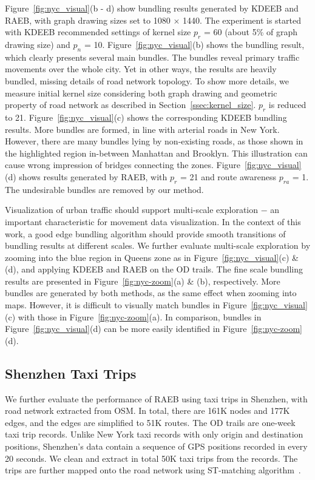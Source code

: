 Figure~\ref{fig:nyc_visual}(b - d) show bundling results generated by KDEEB and RAEB, with graph drawing sizes set to 1080 $\times$ 1440.
The experiment is started with KDEEB recommended settings of kernel size $p_r$ = 60 (about 5\% of graph drawing size) and $p_n$ = 10.
Figure~\ref{fig:nyc_visual}(b) shows the bundling result, which clearly presents several main bundles.
The bundles reveal primary traffic movements over the whole city.
Yet in other ways, the results are heavily bundled, missing details of road network topology.
To show more details, we measure initial kernel size considering both graph drawing and geometric property of road network as described in Section~\ref{ssec:kernel_size}.
$p_r$ is reduced to 21.
Figure~\ref{fig:nyc_visual}(c) shows the corresponding KDEEB bundling results.
More bundles are formed, in line with arterial roads in New York.
However, there are many bundles lying by non-existing roads, as those shown in the highlighted region in-between Manhattan and Brooklyn.
This illustration can cause wrong impression of bridges connecting the zones.
Figure~\ref{fig:nyc_visual}(d) shows results generated by RAEB, with $p_r$ = 21 and route awareness $p_{ra}$ = 1.
The undesirable bundles are removed by our method.

Visualization of urban traffic should support multi-scale exploration $-$ an important characteristic for movement data visualization.
In the context of this work, a good edge bundling algorithm should provide smooth transitions of bundling results at different scales.
We further evaluate multi-scale exploration by zooming into the blue region in Queens zone as in Figure~\ref{fig:nyc_visual}(c) \& (d), and applying KDEEB and RAEB on the OD trails.
The fine scale bundling results are presented in Figure~\ref{fig:nyc-zoom}(a) \& (b), respectively.
More bundles are generated by both methods, as the same effect when zooming into maps.
However, it is difficult to visually match bundles in Figure~\ref{fig:nyc_visual}(c) with those in Figure~\ref{fig:nyc-zoom}(a).
In comparison, bundles in Figure~\ref{fig:nyc_visual}(d) can be more easily identified in Figure~\ref{fig:nyc-zoom}(d).

\subsection{Shenzhen Taxi Trips}
\label{ssec:study3}

We further evaluate the performance of RAEB using taxi trips in Shenzhen, with road network extracted from OSM.
In total, there are 161K nodes and 177K edges, and the edges are simplified to 51K routes.
The OD trails are one-week taxi trip records.
Unlike New York taxi records with only origin and destination positions, Shenzhen's data contain a sequence of GPS positions recorded in every 20 seconds.
We clean and extract in total 50K taxi trips from the records.
The trips are further mapped onto the road network using ST-matching algorithm~\cite{lou_2009_map}.

